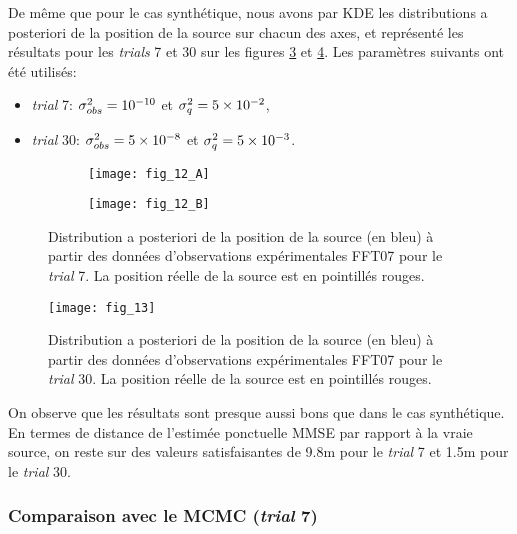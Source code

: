 De même que pour le cas synthétique, nous avons  par KDE les distributions a posteriori de la position de la source sur chacun des axes, et représenté les résultats pour les \textit{trials} 7 et 30 sur les figures \ref{fig_12_AE} et \ref{fig_13_AE}. Les paramètres suivants ont été utilisés:

\begin{itemize}
	\item \textit{trial} 7: ${\sigma_{obs}^2} = 10^{-10}$ et $\sigma_q^2 = 5\times 10^{-2}$,
	\item \textit{trial} 30: ${\sigma_{obs}^2} = 5 \times 10^{-8}$ et $\sigma_q^2 = 5\times 10^{-3}$.\\
\end{itemize}

\begin{figure}[h!]
	\centering
	\begin{subfigure}[t]{0.5\textwidth}
		\centering
		\texttt{[image: fig\_12\_A]}
		\caption{}
		\label{fig_12_A}
	\end{subfigure}%
	\begin{subfigure}[t]{0.5\textwidth}
		\centering
		\texttt{[image: fig\_12\_B]}
		\caption{}
		\label{fig_12_B}
	\end{subfigure}
	\caption{Distribution a posteriori de la position de la source (en bleu) à partir des données d'observations expérimentales FFT07 pour le \textit{trial} 7. La position réelle de la source est en pointillés rouges.} 
	\label{fig_12_AE}		
\end{figure}

\begin{figure}[h!]
	\centering
	\texttt{[image: fig\_13]}
	\caption{Distribution a posteriori de la position de la source (en bleu) à partir des données d'observations expérimentales FFT07 pour le \textit{trial} 30. La position réelle de la source est en pointillés rouges.}
	\label{fig_13_AE}
\end{figure}

On observe que les résultats sont presque aussi bons que dans le cas synthétique. En termes de distance de l'estimée ponctuelle MMSE par rapport à la vraie source, on reste sur des valeurs satisfaisantes de 9.8m pour le \textit{trial} 7 et 1.5m pour le \textit{trial} 30. 

\subsubsection{Comparaison avec le MCMC (\textit{trial} 7)}

